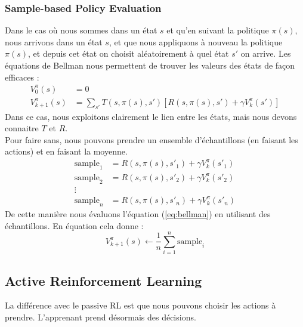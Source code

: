 \subsubsection{Sample-based Policy Evaluation}
Dans le cas où nous sommes dans un état $s$ et qu'en suivant la politique $\pi(s)$, nous arrivons dans un état $s$, et que nous
appliquons à nouveau la politique $\pi(s)$, et depuis cet état on choisit aléatoirement à quel état $s'$ on arrive. Les équations
de Bellman nous permettent de trouver les valeurs des états de façon efficaces :
\begin{equation}
    \begin{aligned}
        V_0^{\pi}(s)&=0\\
        V_{k+1}^{\pi}(s)&=\sum_{s'}T(s,\pi(s),s')[R(s,\pi(s),s')+\gamma V_k^{\pi}(s')]
    \end{aligned}
\label{eq:bellman}
\end{equation}
Dans ce cas, nous exploitons clairement le lien entre les états, mais nous devons connaitre $T$ et $R$.\\
Pour faire sans, nous pouvons prendre un ensemble d'échantillons (en faisant les actions) et en faisant la moyenne.
\begin{equation*}
    \begin{aligned}
        \text{sample}_1 &= R(s,\pi(s),s'_1)+\gamma V^\pi_k(s'_1)\\
        \text{sample}_2 &= R(s,\pi(s),s'_2)+\gamma V^\pi_k(s'_2)\\
        \vdots\\
        \text{sample}_n &= R(s,\pi(s),s'_n)+\gamma V^\pi_k(s'_n)
    \end{aligned}
\end{equation*}
De cette manière nous évaluons l'équation (\ref{eq:bellman}) en utilisant des échantillons. En équation cela donne :
\begin{equation*}
    V_{k+1}^{\pi}(s)\leftarrow\frac{1}{n}\sum_{i=1}^{n}\text{sample}_i
\end{equation*}


\subsection{Active Reinforcement Learning} %
La différence avec le passive RL est que nous pouvons choisir les actions à prendre. L'apprenant prend désormais des décisions.



